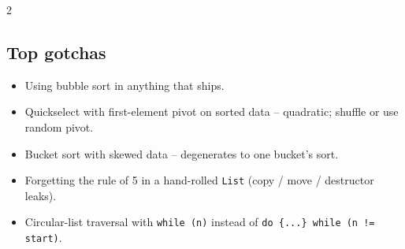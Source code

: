 \documentclass[10pt]{article}
\begin{document}
\begin{multicols}{2}
\subsection*{Top gotchas}
\begin{itemize}
    \item Using bubble sort in anything that ships.
    \item Quickselect with first-element pivot on sorted data --
    quadratic; shuffle or use random pivot.
    \item Bucket sort with skewed data -- degenerates to one
    bucket's sort.
    \item Forgetting the rule of 5 in a hand-rolled \texttt{List}
    (copy / move / destructor leaks).
    \item Circular-list traversal with \texttt{while (n)} instead
    of \texttt{do \{...\} while (n != start)}.
\end{itemize}

\end{multicols}
\end{document}
